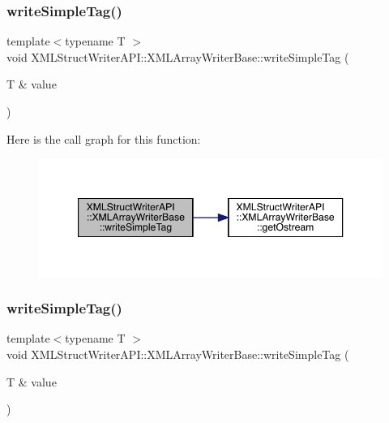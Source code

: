 \subsubsection{\texorpdfstring{writeSimpleTag()}{writeSimpleTag()}\hspace{0.1cm}{\footnotesize\ttfamily [2/3]}}
{\footnotesize\ttfamily template$<$typename T $>$ \\
void X\+M\+L\+Struct\+Writer\+A\+P\+I\+::\+X\+M\+L\+Array\+Writer\+Base\+::write\+Simple\+Tag (\begin{DoxyParamCaption}\item[{T \&}]{value }\end{DoxyParamCaption})\hspace{0.3cm}{\ttfamily [inline]}}

Here is the call graph for this function\+:
\nopagebreak
\begin{figure}[H]
\begin{center}
\leavevmode
\includegraphics[width=347pt]{d5/d41/classXMLStructWriterAPI_1_1XMLArrayWriterBase_a7c0092991561b5000ae55724cdc3d062_cgraph}
\end{center}
\end{figure}
\mbox{\label{classXMLStructWriterAPI_1_1XMLArrayWriterBase_a7c0092991561b5000ae55724cdc3d062}} 
\subsubsection{\texorpdfstring{writeSimpleTag()}{writeSimpleTag()}\hspace{0.1cm}{\footnotesize\ttfamily [3/3]}}
{\footnotesize\ttfamily template$<$typename T $>$ \\
void X\+M\+L\+Struct\+Writer\+A\+P\+I\+::\+X\+M\+L\+Array\+Writer\+Base\+::write\+Simple\+Tag (\begin{DoxyParamCaption}\item[{T \&}]{value }\end{DoxyParamCaption})\hspace{0.3cm}{\ttfamily [inline]}}

